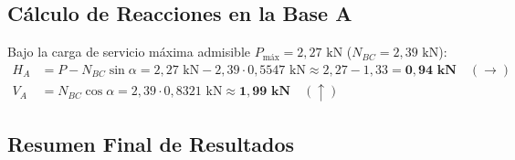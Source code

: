 \subsection{Cálculo de Reacciones en la Base A}

Bajo la carga de servicio máxima admisible $P_{\text{máx}} = 2{,}27\text{ kN}$ ($N_{BC} = 2{,}39\text{ kN}$):
\begin{align}
    H_A &= P - N_{BC}\sin\alpha = 2{,}27\text{ kN} - 2{,}39 \cdot 0{,}5547\text{ kN} \approx 2{,}27 - 1{,}33 = \mathbf{0{,}94\text{ kN}} \quad (\rightarrow) \\
    V_A &= N_{BC}\cos\alpha = 2{,}39 \cdot 0{,}8321\text{ kN} \approx \mathbf{1{,}99\text{ kN}} \quad (\uparrow)
\end{align}

\subsection*{Resumen Final de Resultados}

\begin{table}[H]
    \centering
    \caption{Comparación de estados límites y dimensionamiento de la carga admisible $P$.}
    \vspace{2mm}
    \label{tab:resumen_columna_tirante}
\end{table}

